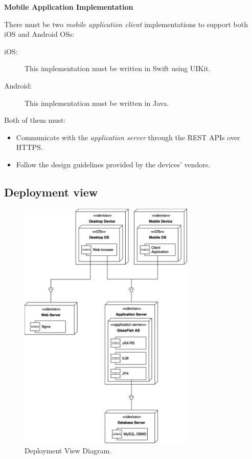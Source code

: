 \documentclass{article}
\begin{document}
	\bigskip
	\noindent
	\textbf{Mobile Application Implementation}

	\medskip
	\noindent
	There must be two \textit{mobile application client} implementations to support both iOS and Android OSs:
	\begin{description}
		\item [iOS:] This implementation must be written in Swift using UIKit.
		\item [Android:] This implementation must be written in Java.
	\end{description}

	\bigskip
	\noindent
	Both of them must:
	\begin{itemize}
	\item Communicate with the \textit{application server} through the REST APIs over HTTPS.
	\item Follow the design guidelines provided by the devices' vendors.
	\end{itemize}

	\subsection{Deployment view}
	\begin{figure}[!ht]
	\centering
	\includegraphics[width=0.75\textwidth]{img/diagrams/dv.png}
	\caption{Deployment View Diagram.}
	\end{figure}
\end{document}
